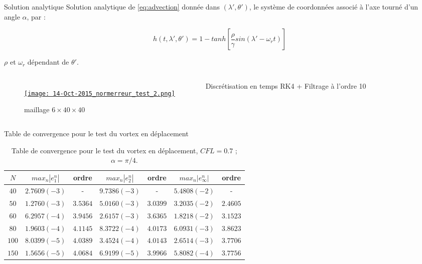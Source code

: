 \documentclass[11pt]{beamer}
\begin{document}
\begin{frame}
\begin{block}{Solution analytique}
Solution analytique de \eqref{eq:advection} donnée dans $( \lambda', \theta')$, le système de coordonnées associé à l'axe tourné d'un angle $\alpha$, par :

$$h(t, \lambda', \theta') = 1 -tanh \left[ \frac{\rho}{\gamma} sin( \lambda' - \omega_r t ) \right]$$

$\rho$ et $\omega_r$ dépendant de $\theta'$.
\end{block}

\begin{columns}
\begin{figure}
\href{run:ref_7363145849_test_2.avi}{\texttt{[image: 14-Oct-2015\_normerreur\_test\_2.png]}} 
\caption{maillage $6 \times 40 \times 40$}
\end{figure}

Discrétisation en temps RK4 + Filtrage à l'ordre 10
\end{columns}

\end{frame}


\begin{frame}{Table de convergence pour le test du vortex en déplacement}
\begin{table}
\begin{tabular}{c||cc|cc|cc}
$N$ & $max_n |e_1^n|$ & ordre  & $max_n |e_2^n|$ & ordre  & $max_n |e_{\infty}^n|$ & ordre \\
\hline
\hline
$40$ & $2.7609 (-3)$ & -  & $9.7386 (-3)$ & - & $5.4808 (-2)$  & - \\
\hline 
$50$ & $1.2760 (-3)$ & $3.5364$ & $5.0160 (-3)$ & $3.0399$ & $3.2035 (-2)$ & $2.4605$ \\
\hline
$60$ & $6.2957 (-4)$ & $3.9456$ & $2.6157 (-3)$ & $3.6365$ & $1.8218 (-2)$ & $3.1523$ \\
\hline
$80$ & $1.9603 (-4) $ & $4.1145$ & $8.3722 (-4)$ & $4.0173$ & $6.0931 (-3)$ & $3.8623$ \\
\hline
$100$ & $8.0399 (-5)$ & $4.0389$ & $3.4524 (-4)$ & $4.0143$ & $2.6514 (-3)$ & $3.7706$\\
\hline
$150$ & $1.5656 (-5)$ & $4.0684$ & $6.9199 (-5)$ & $3.9966$ & $5.8082 (-4)$ & $3.7756$
\end{tabular}
\caption{Table de convergence pour le test du vortex en déplacement, $CFL = 0.7$ ; $\alpha = \pi /4$.}\end{table}

\end{frame}
\end{document}
